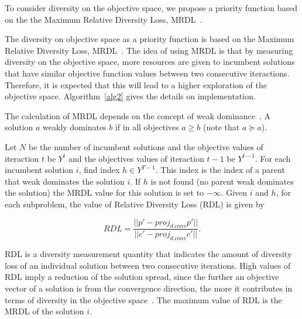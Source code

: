 To consider diversity on the objective space, we propose a priority function based on the the Maximum Relative Diversity Loss, MRDL~\cite{gee2015online}.


The diversity on objective space as a priority function  is based on the Maximum Relative Diversity Loss, MRDL~\cite{gee2015online}.  The idea of using MRDL is that by measuring diversity on the objective space, more resources are given to incumbent solutions that have similar objective function values between two consecutive iteractions. Therefore, it is expected that this will lead to a higher exploration of the objective space. Algorithm~\ref{alg2} gives the details on implementation.

The calculation of MRDL depends on the concept of weak dominance~\cite{zitzler2003performance}. A solution $a$ weakly dominates $b$ if in all objectives $a \geq b$ (note that $a \succeq a$).
 
Let $N$ be the number of incumbent solutions and the objective values of iteraction $t$ be $Y^t$ and the objectives values of iteraction $t-1$ be $Y^{t-1}$. For each incumbent solution $i$, find index $h \in Y^{T-1}$. This index is the index of a parent that weak dominates the solution $i$. If $h$ is not found (no parent weak dominates the solution) the MRDL value for this solution is set to $-\infty$. Given $i$ and $h$, for each subproblem, the value of Relative Diversity Loss (RDL) is given by 

\begin{equation}
RDL = \dfrac{ ||p \prime - proj_{d.conv}p \prime|| }{||c \prime - proj_{d.conv}c \prime||}.
\end{equation}



RDL is a diversity measurement quantity that indicates the amount of diversity loss of an individual solution between two consecutive iterations. High values of RDL imply a reduction of the solution spread, since the further an objective vector of a solution is from the convergence direction, the more it contributes in terms of diversity in the objective space~\cite{gee2015online}. The maximum value of RDL is the MRDL of the solution $i$.




